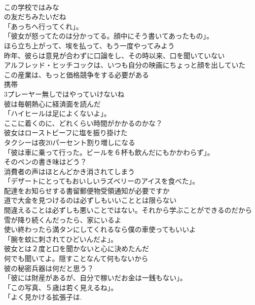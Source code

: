 \documentclass[8pt]{extreport}
\begin{document}
\begin{CJK}{UTF8}{min}
\\	この学校ではみな 
\\	の友だちみたいだね	
\\	「あっちへ行ってくれ」。	
\\	「彼女が怒ってたのは分かってる。顔中にそう書いてあったもの」。	
\\	ほら立ち上がって、埃を払って、もう一度やってみよう	
\\	昨年、彼らは意見が合わずに口論をし、その時以来、口を聞いていない	
\\	アルフレッド・ヒッチコックは、いつも自分の映画にちょっと顔を出していた	
\\	この産業は、もっと価格競争をする必要がある	
\\	携帯
\\	3プレーヤー無しではやっていけないね	
\\	彼は毎朝熱心に経済面を読んだ	
\\	「ハイヒールは足によくないよ」。	
\\	ここに着くのに、どれくらい時間がかかるのかな？	
\\	彼女はローストビーフに塩を振り掛けた	
\\	タクシーは夜20パーセント割り増しになる	
\\	「彼は車に乗って行った。ビールを６杯も飲んだにもかかわらず」。	
\\	そのペンの書き味はどう？	
\\	消費者の声はほとんどかき消されてしまう	
\\	「デザートにとってもおいしいラズベリーのアイスを食べた」。	
\\	配達をお知らせする書留郵便物受領通知が必要ですか	
\\	道で大金を見つけるのは必ずしもいいこととは限らない	
\\	間違えることは必ずしも悪いことではない。それから学ぶことができるのだから	
\\	雪が降り続くんだったら、家にいるよ	
\\	使い終わったら満タンにしてくれるなら僕の車使ってもいいよ	
\\	「腕を蚊に刺されてひどいんだよ」。	
\\	彼女とは２度と口を聞かないと心に決めたんだ	
\\	何でも聞いてよ。隠すことなんて何もないから	
\\	彼の秘密兵器は何だと思う？	
\\	「彼には財産があるが、自分で稼いだお金は一銭もない」。	
\\	「この写真、５歳は若く見えるね」。	
\\	「よく見かける拡張子は.

\end{CJK}
\end{document}
